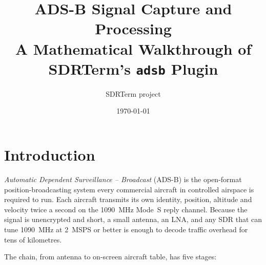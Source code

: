\documentclass[11pt,a4paper]{article}
\title{ADS-B Signal Capture and Processing\\
       \large A Mathematical Walkthrough of SDRTerm's \texttt{adsb} Plugin}
\author{SDRTerm project}
\date{\today}
\begin{document}
\maketitle
\tableofcontents
\vspace{2em}

\section{Introduction}

\emph{Automatic Dependent Surveillance -- Broadcast} (ADS-B) is the
open-format position-broadcasting system every commercial aircraft in
controlled airspace is required to run.  Each aircraft transmits its own
identity, position, altitude and velocity twice a second on the
\SI{1090}{MHz} Mode~S reply channel.  Because the signal is
unencrypted and short, a small antenna, an LNA, and any SDR that can
tune \SI{1090}{MHz} at \SI{2}{MSPS} or better is enough to decode traffic
overhead for tens of kilometres.

The chain, from antenna to on-screen aircraft table, has five stages:

\begin{center}
\end{center}
\end{document}
